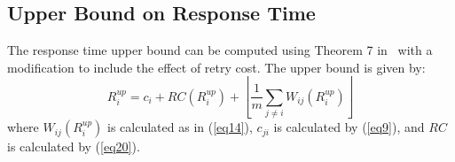 \documentclass[12pt,english]{report}
\begin{document}
\subsection{Upper Bound on Response Time}

The response time upper bound can be computed using Theorem 7 in~\cite{key-2} with a modification to include the effect of retry cost. The upper bound is given by:
\begin{equation}
R_{i}^{up}=c_{i}+RC(R_{i}^{up})+\left\lfloor\frac{1}{m}\sum_{j\ne i}W_{ij}(R_{i}^{up})\right\rfloor\label{eq22}\end{equation}
where $W_{ij}(R_{i}^{up})$ is calculated as in (\ref{eq14}), $c_{ji}$ is calculated by (\ref{eq9}), and $RC$ is calculated by (\ref{eq20}).

\end{document}
